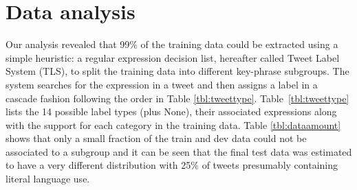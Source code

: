 \documentclass[11pt,letterpaper]{article}
\begin{document}



\section{Data analysis}\label{sec:data}
\label{sec::dataanalysis}

Our analysis revealed that 99\% of the training data could be extracted using a simple heuristic:  a regular expression decision list, hereafter called Tweet Label System (TLS),  to split the training data into different key-phrase subgroups. The system searches for the expression in a tweet and then assigns a label in a cascade fashion following the order in Table \ref{tbl:tweettype}. %
Table~\ref{tbl:tweettype} lists the 14 possible label types (plus {\sc None}), their associated expressions along with the support for each category in the training data. Table \ref{tbl:dataamount} shows that only a small fraction of the train and dev data could not be associated to a subgroup and it can be seen that the final test data was estimated to have a very different distribution with 25\% of tweets presumably containing literal language use.
\end{document}
